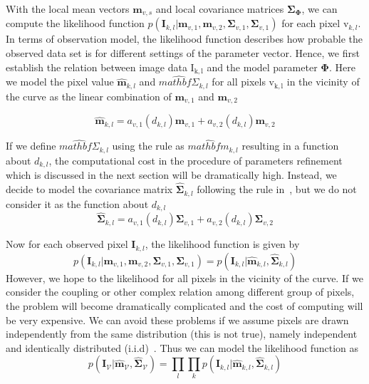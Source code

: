 With the local mean vectors $\mathbf{m}_{v,s}$  and local covariance matrices
$\mathbf{\Sigma}_{\mathbf{\Phi}}$, we can compute the
likelihood function   $p(\mathbf{I}_{k,l} | \mathbf{m}_{v,1}, \mathbf{m}_{v,2},
  \mathbf{\Sigma}_{v,1}, \mathbf{\Sigma}_{v,1})$ for each pixel
  $\mathrm{v}_{k,l}$. In terms of observation model, the likelihood
  function describes how probable the observed data set is for
  different settings of the parameter vector. Hence, we first establish
  the relation between image data $\mathrm{I_{k,l}}$ and the model
  parameter $\mathbf{\Phi}$. Here we model the pixel value
  $\hat{\mathbf{m}}_{k,l}$ and $\hat{mathbf{\Sigma}}_{k,l}$
  for all pixels $\mathrm{v_{k,l}}$ in the vicinity of the curve as the
  linear combination of $\mathbf{m}_{v,1}$ and $\mathbf{m}_{v,2}$

  \begin{equation}
    \label{eq:meankl}
    \hat{\mathbf{m}}_{k,l} = a_{v,1}(d_{k,l})\mathbf{m}_{v,1} + a_{v,2}(d_{k,l})\mathbf{m}_{v,2}
  \end{equation}

If we define  $\hat{mathbf{\Sigma}}_{k,l}$ using the rule as
$\hat{mathbf{m}}_{k,l}$ resulting in a function about $d_{k,l}$, the computational cost in the procedure of
parameters refinement which is discussed in the next section  will be dramatically high. Instead, we decide to
model the covariance matrix $\hat{\mathbf{\Sigma}}_{k,l}$ following the
rule in~\cite{hanek2004fitting}, but we do not consider it as the function about $d_{k,l}$
\begin{equation}
  \label{eq:sigmakl}
  \hat{\mathbf{\mathbf{\Sigma}}}_{k,l} = a_{v,1}(d_{k,l})\mathbf{\Sigma}_{v,1} + a_{v,2}(d_{k,l})\mathbf{\Sigma}_{v,2}
\end{equation}

Now for each observed pixel $\mathbf{I}_{k,l}$, the likelihood
function is given by
\begin{equation}
  \label{eq:likelihood}
p(\mathbf{I}_{k,l} | \mathbf{m}_{v,1}, \mathbf{m}_{v,2},
  \mathbf{\Sigma}_{v,1}, \mathbf{\Sigma}_{v,1}) = p(\mathbf{I}_{k,l} | \hat{\mathbf{\mathbf{m}}}_{k,l},\hat{\mathbf{\mathbf{\Sigma}}}_{k,l}) 
\end{equation}
However, we hope to the likelihood for all pixels in the vicinity of
the curve. If we consider the coupling or other complex relation among
different group of pixels, the problem will become dramatically
complicated and the cost of computing will be very expensive. We can
avoid these problems if we assume pixels are drawn independently from the same distribution
(this is not true), namely independent and identically distributed
(i.i.d)~\cite{bishop2006pattern}. Thus we can model the likelihood function as
\begin{equation}
  \label{eq:liklihoodall}
  p(\mathbf{I}_{\mathcal{V}} |
  \hat{\mathbf{\mathbf{m}}}_{\mathcal{V}},\hat{\mathbf{\mathbf{\Sigma}}}_{\mathcal{V}})
  = \prod_l \prod_k p(\mathbf{I}_{k,l} | \hat{\mathbf{\mathbf{m}}}_{k,l},\hat{\mathbf{\mathbf{\Sigma}}}_{k,l}) 
\end{equation}

